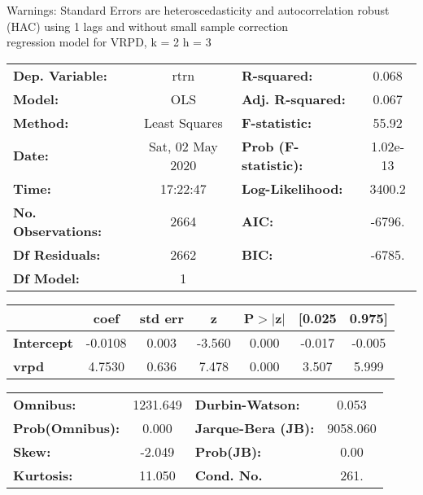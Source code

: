 Warnings: \newline
 [1] Standard Errors are heteroscedasticity and autocorrelation robust (HAC) using 1 lags and without small sample correction\\ 

regression model for VRPD, k = 2 h = 3\begin{center}
\begin{tabular}{lclc}
\toprule
\textbf{Dep. Variable:}    &       rtrn       & \textbf{  R-squared:         } &     0.068   \\
\textbf{Model:}            &       OLS        & \textbf{  Adj. R-squared:    } &     0.067   \\
\textbf{Method:}           &  Least Squares   & \textbf{  F-statistic:       } &     55.92   \\
\textbf{Date:}             & Sat, 02 May 2020 & \textbf{  Prob (F-statistic):} &  1.02e-13   \\
\textbf{Time:}             &     17:22:47     & \textbf{  Log-Likelihood:    } &    3400.2   \\
\textbf{No. Observations:} &        2664      & \textbf{  AIC:               } &    -6796.   \\
\textbf{Df Residuals:}     &        2662      & \textbf{  BIC:               } &    -6785.   \\
\textbf{Df Model:}         &           1      & \textbf{                     } &             \\
\bottomrule
\end{tabular}
\begin{tabular}{lcccccc}
                   & \textbf{coef} & \textbf{std err} & \textbf{z} & \textbf{P$> |$z$|$} & \textbf{[0.025} & \textbf{0.975]}  \\
\midrule
\textbf{Intercept} &      -0.0108  &        0.003     &    -3.560  &         0.000        &       -0.017    &       -0.005     \\
\textbf{vrpd}      &       4.7530  &        0.636     &     7.478  &         0.000        &        3.507    &        5.999     \\
\bottomrule
\end{tabular}
\begin{tabular}{lclc}
\textbf{Omnibus:}       & 1231.649 & \textbf{  Durbin-Watson:     } &    0.053  \\
\textbf{Prob(Omnibus):} &   0.000  & \textbf{  Jarque-Bera (JB):  } & 9058.060  \\
\textbf{Skew:}          &  -2.049  & \textbf{  Prob(JB):          } &     0.00  \\
\textbf{Kurtosis:}      &  11.050  & \textbf{  Cond. No.          } &     261.  \\
\bottomrule
\end{tabular}
\end{center}


